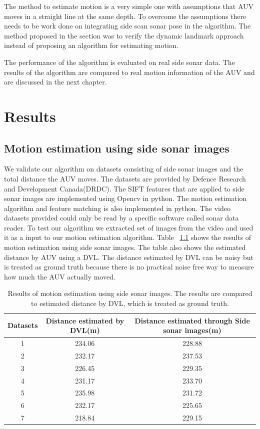 \documentclass[12pt]{dalcsthesis}
\begin{document}
The method to estimate motion is a very simple one with assumptions that AUV moves in a straight line at the same depth. To overcome the assumptions there needs to be work done on integrating side scan sonar pose in the algorithm. The method proposed in the section was to verify the dynamic landmark approach instead of proposing an algorithm for estimating motion. 

The performance of the algorithm is evaluated on real side sonar data. The results of the algorithm are compared to real motion information of the AUV and are discussed in the next chapter. 

\chapter{Results}
\label{ch-: results motion estimation}
\section{Motion estimation using side sonar images}
We validate our algorithm on datasets consisting of side sonar images and the total distance the AUV moves. The datasets are provided by Defence Research and Development Canada(DRDC). The SIFT features that are applied to side sonar images are implemented using Opencv in python. The motion estimation algorithm  and feature matching is also implemented in python. The video datasets provided could only be read by a specific software called sonar data reader. To test our algorithm we extracted set of images from the video and used it as a input to our motion estimation algorithm.  
Table ~\ref{tab-table_motion_estimation} shows the results of motion estimation using side sonar images. The table also shows the estimated distance by AUV using a DVL. The distance estimated by DVL can be noisy but is treated as ground truth because there is no practical noise free way to measure how much the AUV actually moved.      
\begin{table}
\begin{tabular}{|c|c|c|}
\hline 
Datasets & Distance estimated by DVL(m) & Distance estimated through Side sonar images(m)\tabularnewline
\hline 
\hline 
1 & 234.06 & 228.88\tabularnewline
\hline 
2 & 232.17 & 237.53\tabularnewline
\hline 
3 & 226.45 & 229.35\tabularnewline
\hline 
4 & 231.17 & 233.70\tabularnewline
\hline 
5 & 235.98 & 231.72\tabularnewline
\hline 
6 & 232.17 & 225.65\tabularnewline
\hline 
7 & 218.84 & 229.15\tabularnewline
\hline 
\end{tabular}
\caption{\label{tab-table_motion_estimation}Results of motion estimation using side sonar images. The results are compared to estimated distance by DVL, which is treated as ground truth.}
\end{table}
\end{document}
